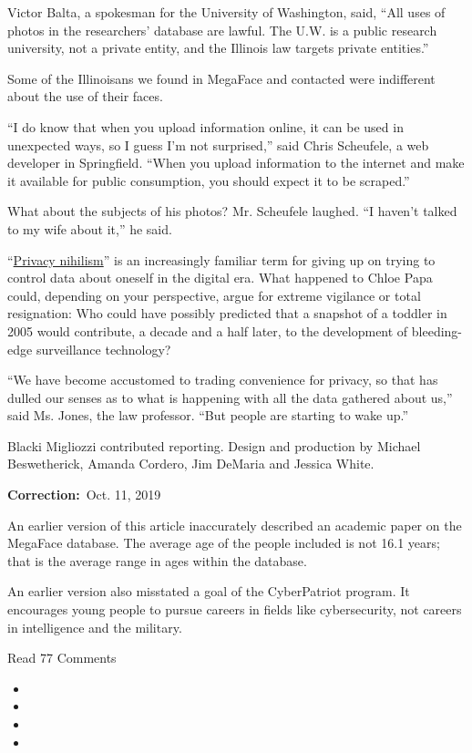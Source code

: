 Victor Balta, a spokesman for the University of Washington, said, ``All
uses of photos in the researchers' database are lawful. The U.W. is a
public research university, not a private entity, and the Illinois law
targets private entities.''

Some of the Illinoisans we found in MegaFace and contacted were
indifferent about the use of their faces.

``I do know that when you upload information online, it can be used in
unexpected ways, so I guess I'm not surprised,'' said Chris Scheufele, a
web developer in Springfield. ``When you upload information to the
internet and make it available for public consumption, you should expect
it to be scraped.''

What about the subjects of his photos? Mr. Scheufele laughed. ``I
haven't talked to my wife about it,'' he said.

``\href{https://www.theatlantic.com/technology/archive/2018/08/the-age-of-privacy-nihilism-is-here/568198/}{Privacy
nihilism}'' is an increasingly familiar term for giving up on trying to
control data about oneself in the digital era. What happened to Chloe
Papa could, depending on your perspective, argue for extreme vigilance
or total resignation: Who could have possibly predicted that a snapshot
of a toddler in 2005 would contribute, a decade and a half later, to the
development of bleeding-edge surveillance technology?

``We have become accustomed to trading convenience for privacy, so that
has dulled our senses as to what is happening with all the data gathered
about us,'' said Ms. Jones, the law professor. ``But people are starting
to wake up.''

Blacki Migliozzi contributed reporting. Design and production by Michael
Beswetherick, Amanda Cordero, Jim DeMaria and Jessica White.

\textbf{Correction:}~Oct. 11, 2019

An earlier version of this article inaccurately described an academic
paper on the MegaFace database. The average age of the people included
is not 16.1 years; that is the average range in ages within the
database.

An earlier version also misstated a goal of the CyberPatriot program. It
encourages young people to pursue careers in fields like cybersecurity,
not careers in intelligence and the military.~~

Read 77 Comments

\begin{itemize}
\item
\item
\item
\item
\end{itemize}


